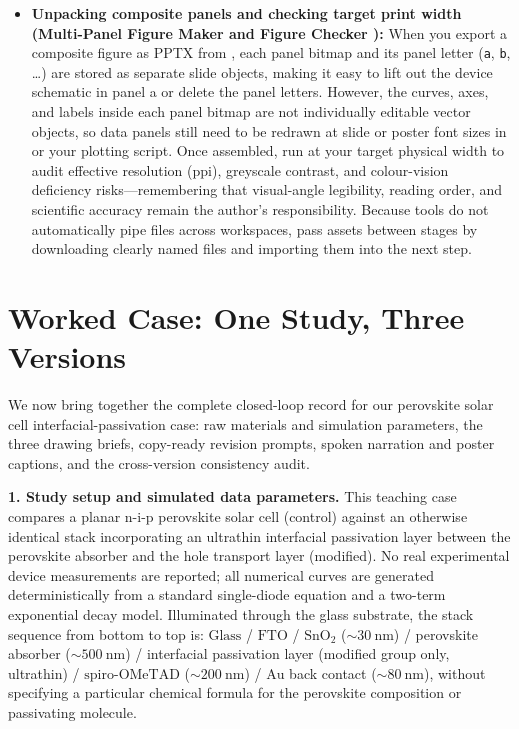 \begin{itemize}
\item \textbf{Unpacking composite panels and checking target print width (Multi-Panel Figure Maker  and Figure Checker ):} When you export a composite figure as PPTX from , each panel bitmap and its panel letter (\texttt{a}, \texttt{b}, \dots) are stored as separate slide objects, making it easy to lift out the device schematic in panel a or delete the panel letters. However, the curves, axes, and labels inside each panel bitmap are not individually editable vector objects, so data panels still need to be redrawn at slide or poster font sizes in  or your plotting script. Once assembled, run  at your target physical width to audit effective resolution (ppi), greyscale contrast, and colour-vision deficiency risks---remembering that visual-angle legibility, reading order, and scientific accuracy remain the author's responsibility. Because tools do not automatically pipe files across workspaces, pass assets between stages by downloading clearly named files and importing them into the next step.
\end{itemize}

\section{Worked Case: One Study, Three Versions}

We now bring together the complete closed-loop record for our perovskite solar cell interfacial-passivation case: raw materials and simulation parameters, the three drawing briefs, copy-ready revision prompts, spoken narration and poster captions, and the cross-version consistency audit.

\textbf{1. Study setup and simulated data parameters.} This teaching case compares a planar n-i-p perovskite solar cell (control) against an otherwise identical stack incorporating an ultrathin interfacial passivation layer between the perovskite absorber and the hole transport layer (modified). No real experimental device measurements are reported; all numerical curves are generated deterministically from a standard single-diode equation and a two-term exponential decay model. Illuminated through the glass substrate, the stack sequence from bottom to top is: $\text{Glass}$ / $\text{FTO}$ / $\text{SnO}_2$ ($\sim 30\ \text{nm}$) / perovskite absorber ($\sim 500\ \text{nm}$) / interfacial passivation layer (modified group only, ultrathin) / $\text{spiro-OMeTAD}$ ($\sim 200\ \text{nm}$) / $\text{Au}$ back contact ($\sim 80\ \text{nm}$), without specifying a particular chemical formula for the perovskite composition or passivating molecule.

